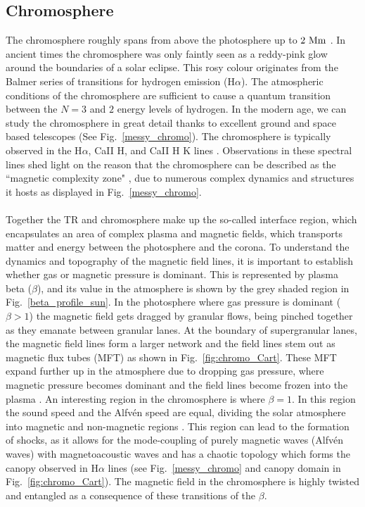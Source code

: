 \documentclass[12pt]{ociamthesis}
\newcommand{\Alfven}{Alfv\'{e}n }
\newcommand{\np}{\\ \\}
\begin{document}
\subsection{Chromosphere}
\label{ssec:Chromosphere}
The chromosphere roughly spans from above the photosphere up to $2~\rm{Mm}$ \citep{Lang_2006ses}. In ancient times the chromosphere was only faintly seen as a reddy-pink glow around the boundaries of a solar eclipse. This rosy colour originates from the Balmer series of transitions for hydrogen emission (H$\alpha$). The atmospheric conditions of the chromosphere are sufficient to cause a quantum transition between the $N=3$ and $2$ energy levels of hydrogen. In the modern age, we can study the chromosphere in great detail thanks to excellent ground and space based telescopes (See Fig.~\ref{messy_chromo}). The chromosphere is typically observed in the H$\alpha$, CaII H, and CaII H K lines \citep{Ayres2019sgspbook27A}. Observations in these spectral lines shed light on the reason that the chromosphere can be described as the ``magnetic complexity zone" \citep{Ayres2009astro2010S9A}, due to numerous complex dynamics and structures it hosts as displayed in Fig.~\ref{messy_chromo}. \np  
%
Together the TR and chromosphere make up the so-called interface region, which encapsulates an area of complex plasma and magnetic fields, which transports matter and energy between the photosphere and the corona. To understand the dynamics and topography of the magnetic field lines, it is important to establish whether gas or magnetic pressure is dominant. This is represented by plasma beta ($\beta$), and its value in the atmosphere is shown by the grey shaded region in Fig.~\ref{beta_profile_sun}. In the photosphere where gas pressure is dominant ($\beta>1$) the magnetic field gets dragged by granular flows, being pinched together as they emanate between granular lanes. At the boundary of supergranular lanes, the magnetic field lines form a larger network and the field lines stem out as magnetic flux tubes (MFT) as shown in Fig.~\ref{fig:chromo_Cart}. These MFT expand further up in the atmosphere due to dropping gas pressure, where magnetic pressure becomes dominant and the field lines become frozen into the plasma \citep{Ayres2009astro2010S9A}. An interesting region in the chromosphere is where $\beta=1$. In this region the sound speed and the \Alfven speed are equal, dividing the solar atmosphere into magnetic and non-magnetic regions \citep{Tsiropoula2012}. This region can lead to the formation of shocks, as it allows for the mode-coupling of purely magnetic waves (\Alfven waves) with magnetoacoustic waves \citep{Hollweg1982SoPh7535H, Rosenthal2002ApJ564508R,Bogdan2003ApJ599626B, Cally2008SoPh251251C, Wang2020ApJ891110W} and has a chaotic topology which forms the canopy observed in H$\alpha$ lines (see Fig.~\ref{messy_chromo} and canopy domain in Fig.~\ref{fig:chromo_Cart}). The magnetic field in the chromosphere is highly twisted and entangled as a consequence of these transitions of the $\beta$. \np
\end{document}
